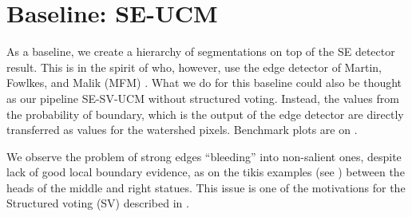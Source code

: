 \section{Baseline: SE-UCM}
As a baseline, we create a hierarchy of segmentations on top of the SE detector result. This is in the spirit of \cite{Arbelaez2006boundary} who, however, use the edge detector of Martin, Fowlkes, and Malik (MFM) \cite{Martin2004learning}. What we do for this baseline could also be thought as our pipeline SE-SV-UCM without structured voting. Instead, the values from the probability of boundary, which is the output of the edge detector are directly transferred as values for the watershed pixels. Benchmark plots are on .

We observe the problem of strong edges ``bleeding'' into non-salient ones, despite lack of good local boundary evidence, as on the tikis examples (see ) between the heads of the middle and right statues. This issue is one of the motivations for the Structured voting (SV) described in .%

